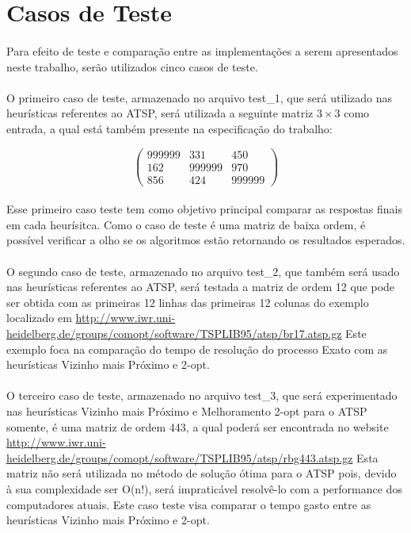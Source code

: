 \documentclass[12pt,a4paper]{article}
\begin{document}
 \section{Casos de Teste}  
  {\paragraph{} Para efeito de teste e comparação entre as implementações a serem apresentados neste trabalho, serão utilizados cinco casos de teste. }
  {\paragraph{} O primeiro caso de teste, armazenado no arquivo test\_1, que será utilizado nas heurísticas referentes ao ATSP, será utilizada a seguinte matriz $3 \times 3$ como entrada, a qual está também presente na especificação do trabalho:\\ }
  \[ \left( \begin{array}{ccc}
999999 & 331 & 450 \\
162 & 999999 & 970 \\
856 & 424 & 999999 \end{array} \right)\]
  {\paragraph{} Esse primeiro caso teste tem como objetivo principal comparar as respostas finais em cada heurísitca. Como o caso de teste é uma matriz de baixa ordem, é possível verificar a olho se os algoritmos estão retornando os resultados esperados.}
  {\paragraph{} O segundo caso de teste, armazenado no arquivo test\_2, que também será usado nas heurísticas referentes ao ATSP, será testada a matriz de ordem 12 que pode ser obtida com as primeiras 12 linhas das primeiras 12 colunas do exemplo localizado em \url{http://www.iwr.uni-heidelberg.de/groups/comopt/software/TSPLIB95/atsp/br17.atsp.gz} Este exemplo foca na comparação do tempo de resolução do processo Exato com as heurísticas Vizinho mais Próximo e 2-opt. }
  {\paragraph{} O terceiro caso de teste, armazenado no arquivo test\_3, que será experimentado nas heurísticas Vizinho mais Próximo e Melhoramento 2-opt para o ATSP somente, é uma matriz de ordem 443, a qual poderá ser encontrada no website \url{http://www.iwr.uni-heidelberg.de/groups/comopt/software/TSPLIB95/atsp/rbg443.atsp.gz} Esta matriz não será utilizada no método de solução ótima para o ATSP pois, devido à sua complexidade ser O(n!), será impraticável resolvê-lo com a performance dos computadores atuais. Este caso teste visa comparar o tempo gasto entre as heurísticas Vizinho mais Próximo e 2-opt. }
\end{document}
